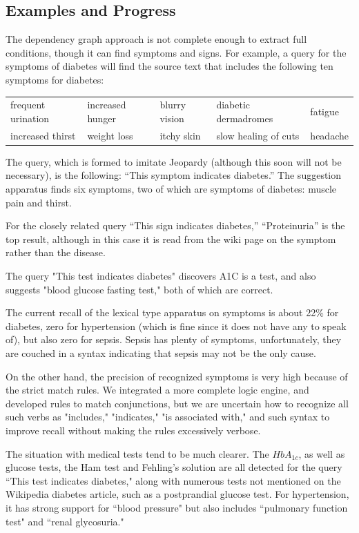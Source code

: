 \documentclass[12pt,letterpaper]{article}
\begin{document}

\subsection{Examples and Progress}
The dependency graph approach is not complete enough to extract full conditions, though it can find symptoms and signs. For example, a query for the symptoms of diabetes will find the source text that includes the following ten symptoms for diabetes:

\medskip
\begin{tabular}{lllll}
frequent urination & increased hunger & blurry vision & 
diabetic dermadromes & fatigue \\
increased thirst & weight loss & itchy skin & slow healing of cuts & headache  \\
\end{tabular}
\medskip

The query, which is formed to imitate Jeopardy (although this soon will not be necessary), is the following: ``This symptom indicates 
diabetes.'' The suggestion apparatus finds six symptoms, two of which are symptoms of diabetes: muscle pain and thirst.

For the closely related query ``This sign indicates diabetes,'' ``Proteinuria'' is the top result, although in this case it is read from the wiki page on the symptom rather than the disease.

The query "This test indicates diabetes" discovers A1C is a test, and also suggests "blood glucose fasting test," both of which are correct.

The current recall of the lexical type apparatus on symptoms is about 22\% for diabetes, zero for hypertension (which is fine since it does not have any to speak of), but also zero for sepsis. Sepsis has plenty of symptoms, unfortunately, they are couched in a syntax indicating that sepsis may not be the only cause.

On the other hand, the precision of recognized symptoms is very high because of the strict match rules. We integrated a more complete logic engine, and developed rules to match conjunctions, but we are uncertain how to recognize all such verbs as "includes," "indicates," "is associated with," and such syntax to improve recall without making the rules excessively verbose. 

The situation with medical tests tend to be much clearer. The $HbA_{1c}$, as well as glucose tests, the Ham test and Fehling's solution are all detected for the query ``This test indicates diabetes," along with numerous tests not mentioned on the Wikipedia diabetes article, such as a postprandial glucose test. For hypertension, it has strong support for ``blood pressure" but also includes ``pulmonary function test" and ``renal glycosuria."
\end{document}
